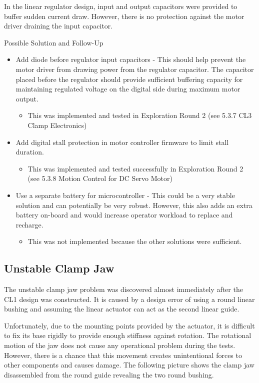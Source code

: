 In the linear regulator design, input and output capacitors were provided to buffer sudden current draw. However, there is no protection against the motor driver draining the input capacitor.

Possible Solution and Follow-Up
\begin{itemize}
    \item Add diode before regulator input capacitors - This should help prevent the motor driver from drawing power from the regulator capacitor. The capacitor placed before the regulator should provide sufficient buffering capacity for maintaining regulated voltage on the digital side during maximum motor output.
    \begin{itemize}
        \item This was implemented and tested in Exploration Round 2 (see 5.3.7 CL3 Clamp Electronics)
    \end{itemize}
    \item Add digital stall protection in motor controller firmware to limit stall duration. 
    \begin{itemize}
        \item This was implemented and tested successfully in Exploration Round 2 (see 5.3.8 Motion Control for DC Servo Motor)
    \end{itemize}
    \item Use a separate battery for microcontroller - This could be a very stable solution and can potentially be very robust. However, this also adds an extra battery on-board and would increase operator workload to replace and recharge. 
    \begin{itemize}
        \item This was not implemented because the other solutions were sufficient.
    \end{itemize}
\end{itemize}

\subsection{Unstable Clamp Jaw} 
The unstable clamp jaw problem was discovered almost immediately after the CL1 design was constructed. It is caused by a design error of using a round linear bushing and assuming the linear actuator can act as the second linear guide. 

Unfortunately, due to the mounting points provided by the actuator, it is difficult to fix its base rigidly to provide enough stiffness against rotation. The rotational motion of the jaw does not cause any operational problem during the tests. However, there is a chance that this movement creates unintentional forces to other components and causes damage. The following picture shows the clamp jaw disassembled from the round guide revealing the two round bushing.

